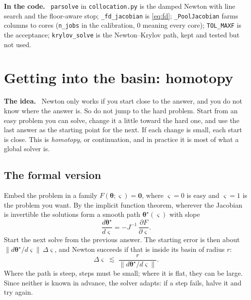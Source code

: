 \documentclass[10pt,a4paper]{article}
\newenvironment{idea}{\begin{shaded}\noindent\textbf{The idea.}\ }{\end{shaded}}
\newenvironment{incode}{\begin{leftbar}\small\noindent\textcolor{codecol}{\textbf{In the code.}}\ }{\end{leftbar}}
\theoremstyle{plain}
\theoremstyle{remark}
\newcommand{\pol}{\bm{\theta}}
\newcommand{\file}[1]{\textcolor{codecol}{\texttt{#1}}}
\newcommand{\code}[1]{\texttt{#1}}
\begin{document}
\begin{incode}
\code{parsolve} in \file{collocation.py} is the damped Newton with line search and the
floor-aware stop; \code{\_fd\_jacobian} is \eqref{eq:fd}; \code{\_PoolJacobian} farms columns to
cores (\code{n\_jobs} in the calibration, $0$ meaning every core); \code{TOL\_MAXF} is the
acceptance; \code{krylov\_solve} is the Newton--Krylov path, kept and tested but not used.
\end{incode}

\section{Getting into the basin: homotopy}
\label{sec:homotopy}

\begin{idea}
Newton only works if you start close to the answer, and you do not know where the answer is.
So do not jump to the hard problem. Start from an easy problem you can solve, change it a little
toward the hard one, and use the last answer as the starting point for the next. If each change
is small, each start is close. This is \emph{homotopy}, or continuation, and in practice it is
most of what a global solver is.
\end{idea}

\subsection{The formal version}

Embed the problem in a family $F(\pol;\varsigma)=\bm 0$, where $\varsigma=0$ is easy and
$\varsigma=1$ is the problem you want. By the implicit function theorem, wherever the Jacobian is
invertible the solutions form a smooth path $\pol^\star(\varsigma)$ with slope
\begin{equation}
  \frac{d\pol^\star}{d\varsigma} = -J^{-1}\,\frac{\partial F}{\partial\varsigma}.
\end{equation}
Start the next solve from the previous answer. The starting error is then about
$\|d\pol^\star/d\varsigma\|\,\Delta\varsigma$, and Newton succeeds if that is inside its basin of
radius $r$:
\begin{equation}
  \Delta\varsigma \;\lesssim\; \frac{r}{\|d\pol^\star/d\varsigma\|}.
  \label{eq:steprule}
\end{equation}
Where the path is steep, steps must be small; where it is flat, they can be large. Since neither
is known in advance, the solver adapts: if a step fails, halve it and try again.
\end{document}
